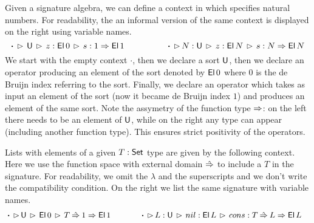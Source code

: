 \documentclass[a4paper,UKenglish,cleveref, autoref]{lipics-v2019}
\begin{document}
\begin{example}\label{ex:contexts}
  Given a signature algebra, we can define a context in which
  specifies natural numbers. For readability, the an informal version
  of the same context is displayed on the right using variable names.
  \[
    \boldsymbol{\cdot}\,\rhd\,\mathsf{U}\,\rhd\,z : \mathsf{El}\,0\,\rhd\,s : 1 \Rightarrow \mathsf{El}\,1
    \hspace{4.9em}
    \boldsymbol{\cdot}\,\rhd\,N:\mathsf{U}\,\rhd\,z : \mathsf{El}\,N\,\rhd\,s : N \Rightarrow \mathsf{El}\,N
  \]
  We start with the empty context $\boldsymbol{\cdot}$, then we
  declare a sort $\mathsf{U}$, then we declare an operator producing an
  element of the sort denoted by $\mathsf{El}\,0$ where $0$ is the de Bruijn
  index referring to the sort. Finally, we declare an operator which
  takes as input an element of the sort (now it became de Bruijn index
  $1$) and produces an element of the same sort. Note the assymetry of
  the function type $\Rightarrow$: on the left there needs to be an element of
  $\mathsf{U}$, while on the right any type can appear (including another
  function type). This ensures strict positivity of the operators.

  Lists with elements of a given $T : \mathsf{Set}$ type are given by the
  following context. Here we use the function space with external
  domain $\mathbin{\hat{\Rightarrow}}$ to include a $T$ in the signature. For readability, we
  omit the $\lambda$ and the superscripts and we don't write the
  compatibility condition. On the right we list the same signature
  with variable names.
  \begin{alignat*}{10}
    & \boldsymbol{\cdot}\,\ext\,\U\,\ext\,\El\,0\,\ext\,T\Ram 1\Ra \El\,1 \hspace{3.56em} \boldsymbol{\cdot}\,\ext\,L:\U\,\ext\,nil : \El\,L\,\ext\,cons : T\Ram L\Ra \El\,L
  \end{alignat*}
 

\end{example}
\end{document}
